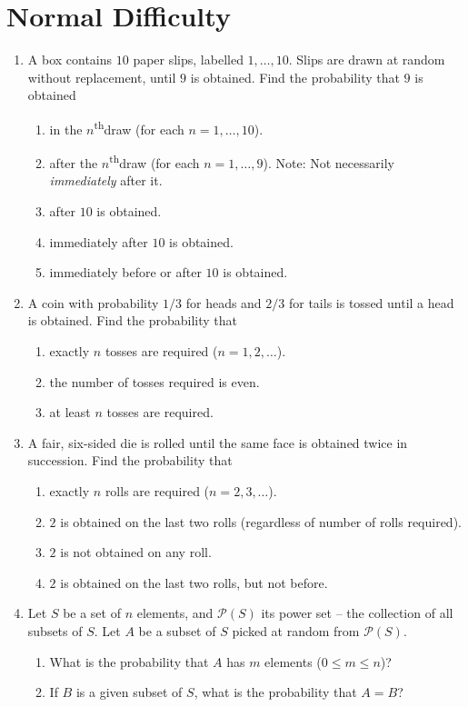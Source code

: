 \documentclass[svgnames]{amsart}
\renewcommand{\th}{\textsuperscript{th}}
\begin{document}
\section{Normal Difficulty}
\begin{enumerate}[leftmargin=*]
\item A box contains $10$ paper slips, labelled $1, \ldots, 10$. Slips are drawn at random without replacement, until $9$ is obtained. Find the probability that $9$ is obtained
\begin{enumerate}
	\item in the $n$\th draw (for each $n = 1, \ldots, 10$).
	\item after the $n$\th draw (for each $n = 1, \ldots, 9$). {\scriptsize Note: Not necessarily \emph{immediately} after it.}
	\item after $10$ is obtained.
	\item immediately after $10$ is obtained.
	\item immediately before or after $10$ is obtained.
\end{enumerate}

\item A coin with probability $1/3$ for heads and $2/3$ for tails is tossed until a head is obtained. Find the probability that
\begin{enumerate}
	\item exactly $n$ tosses are required ($n = 1, 2, \ldots$).
	\item the number of tosses required is even.
	\item at least $n$ tosses are required.
\end{enumerate}

\item A fair, six-sided die is rolled until the same face is obtained twice in succession. Find the probability that
\begin{enumerate}
	\item exactly $n$ rolls are required ($n = 2, 3, \ldots$).
	\item $2$ is obtained on the last two rolls (regardless of number of rolls required).
	\item $2$ is not obtained on any roll.
	\item $2$ is obtained on the last two rolls, but not before.
\end{enumerate}

\item Let $S$ be a set of $n$ elements, and $\mathcal P(S)$ its power set -- the collection of all subsets of $S$. Let $A$ be a subset of $S$ picked at random from $\mathcal P(S)$.
\begin{enumerate}
	\item What is the probability that $A$ has $m$ elements ($0 \le m \le n$)?
	\item If $B$ is a given subset of $S$, what is the probability that $A = B$?
\end{enumerate}


\end{enumerate}
\end{document}

